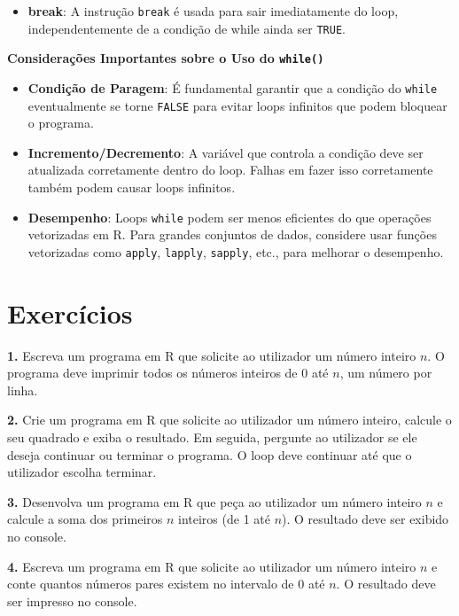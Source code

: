 \documentclass[
]{book}
\providecommand{\tightlist}{%
  \setlength{\itemsep}{0pt}\setlength{\parskip}{0pt}}
\begin{document}
\begin{itemize}
\tightlist
\item
  \textbf{break}: A instrução \texttt{break} é usada para sair imediatamente do
  loop, independentemente de a condição de while ainda ser \texttt{TRUE}.
\end{itemize}

\textbf{Considerações Importantes sobre o Uso do \texttt{while()}}

\begin{itemize}
\item
  \textbf{Condição de Paragem}: É fundamental garantir que a condição do
  \texttt{while} eventualmente se torne \texttt{FALSE} para evitar loops infinitos
  que podem bloquear o programa.
\item
  \textbf{Incremento/Decremento}: A variável que controla a condição deve
  ser atualizada corretamente dentro do loop. Falhas em fazer isso
  corretamente também podem causar loops infinitos.
\item
  \textbf{Desempenho}: Loops \texttt{while} podem ser menos eficientes do que
  operações vetorizadas em R. Para grandes conjuntos de dados,
  considere usar funções vetorizadas como \texttt{apply}, \texttt{lapply}, \texttt{sapply},
  etc., para melhorar o desempenho.
\end{itemize}

\section{Exercícios}\label{exercuxedcios-10}

\textbf{1.} Escreva um programa em R que solicite ao utilizador um número
inteiro \(n\). O programa deve imprimir todos os números inteiros de 0 até
\(n\), um número por linha.

\textbf{2.} Crie um programa em R que solicite ao utilizador um número
inteiro, calcule o seu quadrado e exiba o resultado. Em seguida,
pergunte ao utilizador se ele deseja continuar ou terminar o programa. O
loop deve continuar até que o utilizador escolha terminar.

\textbf{3.} Desenvolva um programa em R que peça ao utilizador um número
inteiro \(n\) e calcule a soma dos primeiros \(n\) inteiros (de 1 até \(n\)).
O resultado deve ser exibido no console.

\textbf{4.} Escreva um programa em R que solicite ao utilizador um número
inteiro \(n\) e conte quantos números pares existem no intervalo de 0 até
\(n\). O resultado deve ser impresso no console.
\end{document}
